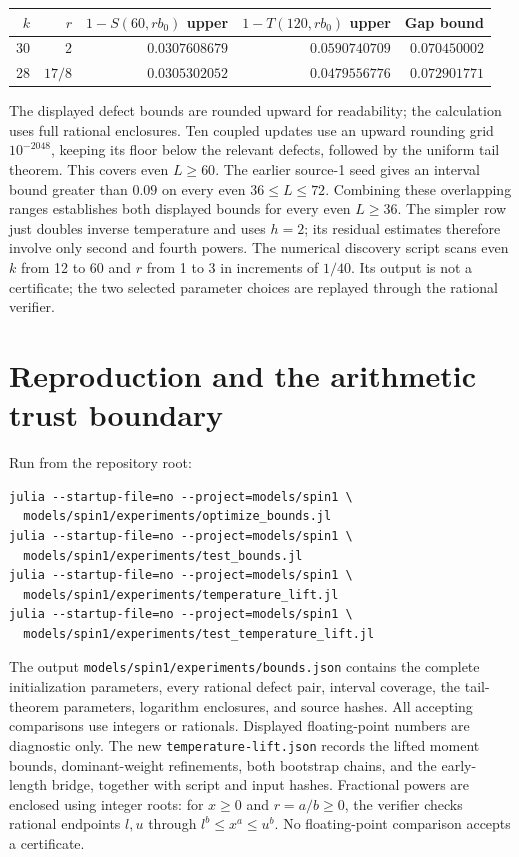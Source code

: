 \documentclass[11pt]{article}
\begin{document}
\begin{center}
\begin{tabular}{rrrrr}
\toprule
$k$ & $r$ & $1-S(60,rb_0)$ upper & $1-T(120,rb_0)$ upper & Gap bound\\
\midrule
30 & $2$ & $0.0307608679$ & $0.0590740709$ & $0.070450002$\\
28 & $17/8$ & $0.0305302052$ & $0.0479556776$ & $0.072901771$\\
\bottomrule
\end{tabular}
\end{center}
The displayed defect bounds are rounded upward for readability; the
calculation uses full rational enclosures. Ten coupled updates use an
upward rounding grid $10^{-2048}$, keeping its floor below the relevant
defects, followed by the uniform tail theorem. This covers even $L\ge60$.
The earlier source-1 seed gives an interval bound greater than $0.09$ on
every even $36\le L\le72$. Combining these overlapping ranges establishes
both displayed bounds for every even $L\ge36$.
The simpler row just doubles inverse temperature and uses $h=2$; its
residual estimates therefore involve only second and fourth powers.
The numerical discovery script scans even $k$ from 12 to 60 and $r$ from
1 to 3 in increments of $1/40$. Its output is not a certificate; the two
selected parameter choices are replayed through the rational verifier.

\section{Reproduction and the arithmetic trust boundary}
Run from the repository root:
\begin{verbatim}
julia --startup-file=no --project=models/spin1 \
  models/spin1/experiments/optimize_bounds.jl
julia --startup-file=no --project=models/spin1 \
  models/spin1/experiments/test_bounds.jl
julia --startup-file=no --project=models/spin1 \
  models/spin1/experiments/temperature_lift.jl
julia --startup-file=no --project=models/spin1 \
  models/spin1/experiments/test_temperature_lift.jl
\end{verbatim}
The output \texttt{models/spin1/experiments/bounds.json} contains the complete
initialization parameters, every rational defect pair, interval coverage,
the tail-theorem parameters, logarithm enclosures, and source hashes.
All accepting comparisons use integers or rationals. Displayed floating-point
numbers are diagnostic only.
The new \texttt{temperature-lift.json} records the lifted moment bounds,
dominant-weight refinements, both bootstrap chains, and the early-length
bridge, together with script and input hashes. Fractional powers are
enclosed using integer roots: for $x\ge0$ and $r=a/b\ge0$, the verifier
checks rational endpoints $l,u$ through $l^b\le x^a\le u^b$.
No floating-point comparison accepts a certificate.
\end{document}

